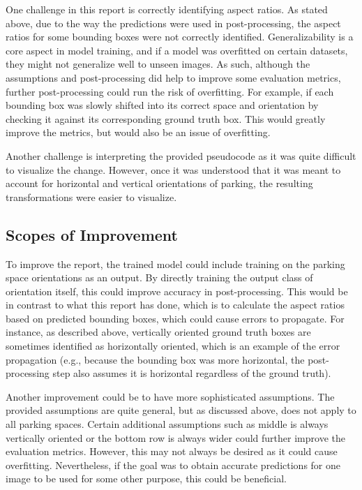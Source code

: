 \documentclass[man]{apa7}
\begin{document}
One challenge in this report is correctly identifying aspect ratios. As stated above, due to the way the predictions were used in post-processing, the aspect ratios for some bounding boxes were not correctly identified. Generalizability is a core aspect in model training, and if a model was overfitted on certain datasets, they might not generalize well to unseen images. As such, although the assumptions and post-processing did help to improve some evaluation metrics, further post-processing could run the risk of overfitting. For example, if each bounding box was slowly shifted into its correct space and orientation by checking it against its corresponding ground truth box. This would greatly improve the metrics, but would also be an issue of overfitting.

Another challenge is interpreting the provided pseudocode as it was quite difficult to visualize the change. However, once it was understood that it was meant to account for horizontal and vertical orientations of parking, the resulting transformations were easier to visualize. 

\subsection{Scopes of Improvement}

To improve the report, the trained model could include training on the parking space orientations as an output. By directly training the output class of orientation itself, this could improve accuracy in post-processing. This would be in contrast to what this report has done, which is to calculate the aspect ratios based on predicted bounding boxes, which could cause errors to propagate. For instance, as described above, vertically oriented ground truth boxes are sometimes identified as horizontally oriented, which is an example of the error propagation (e.g., because the bounding box was more horizontal, the post-processing step also assumes it is horizontal regardless of the ground truth).

Another improvement could be to have more sophisticated assumptions. The provided assumptions are quite general, but as discussed above, does not apply to all parking spaces. Certain additional assumptions such as middle is always vertically oriented or the bottom row is always wider could further improve the evaluation metrics. However, this may not always be desired as it could cause overfitting. Nevertheless, if the goal was to obtain accurate predictions for one image to be used for some other purpose, this could be beneficial.
\end{document}
